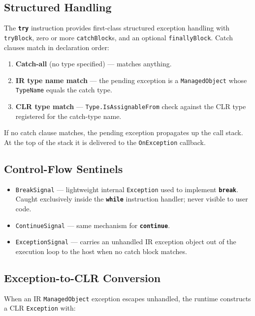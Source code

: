 \documentclass[11pt,a4paper]{article}
\newcommand{\code}[1]{\texttt{\small #1}}
\newcommand{\typename}[1]{\textcolor{typecolor}{\texttt{\small #1}}}
\newcommand{\opcode}[1]{\textbf{\texttt{#1}}}
\begin{document}
\subsection{Structured Handling}

The \opcode{try} instruction provides first-class structured exception
handling with \code{tryBlock}, zero or more \code{catchBlock}s, and an
optional \code{finallyBlock}. Catch clauses match in declaration order:

\begin{enumerate}[leftmargin=2em]
  \item \textbf{Catch-all} (no type specified) — matches anything.
  \item \textbf{IR type name match} — the pending exception is a
    \typename{ManagedObject} whose \code{TypeName} equals the catch type.
  \item \textbf{CLR type match} — \code{Type.IsAssignableFrom} check
    against the CLR type registered for the catch-type name.
\end{enumerate}

If no catch clause matches, the pending exception propagates up the call
stack. At the top of the stack it is delivered to the \code{OnException}
callback.

\subsection{Control-Flow Sentinels}

\begin{itemize}[leftmargin=1.8em]
  \item \typename{BreakSignal} — lightweight internal \typename{Exception}
    used to implement \opcode{break}. Caught exclusively inside the
    \opcode{while} instruction handler; never visible to user code.
  \item \typename{ContinueSignal} — same mechanism for \opcode{continue}.
  \item \typename{ExceptionSignal} — carries an unhandled IR exception
    object out of the execution loop to the host when no catch block
    matches.
\end{itemize}

\subsection{Exception-to-CLR Conversion}

When an IR \typename{ManagedObject} exception escapes unhandled, the runtime
constructs a CLR \typename{Exception} with:
\end{document}
